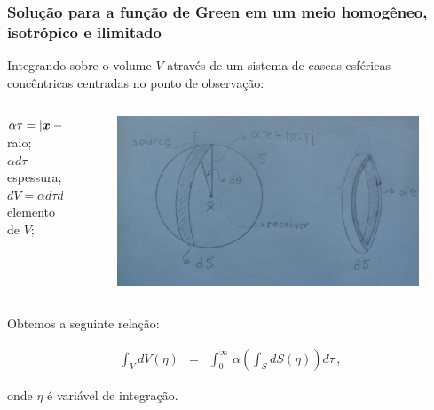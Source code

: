 \documentclass{beamer}
\newcommand{\xvec}{\vc{x}}
\newcommand{\xivec}{\boldmath \xi}
\begin{document}
\begin{frame}
	\frametitle{\textbf{Solu\c{c}\~ao para a fun\c{c}\~ao de Green em um meio homog\^eneo, isotr\'opico e ilimitado}}
	\begin{flushleft}
		\textcolor{red!60!black}{
			Integrando sobre o volume $V$ atrav\'es de um sistema de cascas esf\'ericas conc\^entricas centradas no ponto de observa\c{c}\~ao:}
	\end{flushleft}
	\begin{columns}
		\begin{column}{0.40\textwidth}  
			\begin{flushleft}
				$\alpha\tau = \left|\xvec - \xivec \right|$ {\scriptsize \hspace{0.3cm} raio;} \\
				$\alpha d\tau$       {\scriptsize \hspace{1.7cm}    espessura;}\\ 
				$dV = \alpha d\tau dS$ {\scriptsize \hspace{0.3cm}  elemento de $V$;}
			\end{flushleft}  
		\end{column}
		\begin{column}{0.40\textwidth}   
			\begin{figure}[h!]   
				\includegraphics[scale=0.045]{Fig1.jpg}       
			\end{figure}
		\end{column}
	\end{columns}
	
	\begin{flushleft}
		Obtemos a seguinte rela\c{c}\~ao:
	\end{flushleft}
	\begin{eqnarray}
	\int_{V}dV(\eta) &=& \int_{0}^{\infty} \, \alpha \left( \int_{S} dS(\eta) \right) d\tau\, , 
	\end{eqnarray}
	\begin{flushleft}
		onde $\eta$ \'e vari\'avel de integra\c{c}\~ao.
	\end{flushleft}
	
	
\end{frame}%
\end{document}
